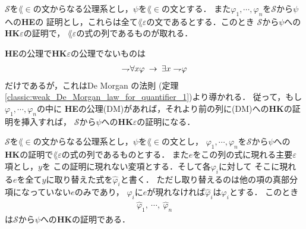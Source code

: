 	\begin{screen}
		\begin{metathm}
		\label{metathm:Henkin_expansion_1}
			$\mathscr{S}$を$\lang{\in}$の文からなる公理系とし，$\psi$を$\lang{\in}$の文とする．
			また$\varphi_{1},\cdots,\varphi_{n}$を$\mathscr{S}$から$\psi$への{\bf HE}の
			証明とし，これらは全て$\lang{\varepsilon}$の文であるとする．このとき
			$\mathscr{S}$から$\psi$への{\bf HK$\varepsilon$}の証明で，
			$\lang{\varepsilon}$の式の列であるものが取れる．
		\end{metathm}
	\end{screen}
	
	\begin{metaprf}
		{\bf HE}の公理で{\bf HK$\varepsilon$}の公理でないものは
		\begin{align}
			\rightharpoondown\hspace{-0.25em} \forall x \varphi \hspace{0.25em}\rightarrow\hspace{0.25em} \exists x \rightharpoondown\hspace{-0.25em} \varphi
		\end{align}
		だけであるが，これはDe Morgan の法則
		(定理\ref{classic:weak_De_Morgan_law_for_quantifier_1})より導かれる．
		従って，もし$\varphi_{1},\cdots,\varphi_{n}$の中に
		{\bf HE}の公理(DM)があれば，それより前の列に(DM)への{\bf HK}の証明を挿入すれば，
		$\mathscr{S}$から$\psi$への{\bf HK$\varepsilon$}の証明になる．
		\QED
	\end{metaprf}
	
	\begin{screen}
		\begin{metathm}
		\label{metathm:Henkin_expansion_2_lemma}
			$\mathscr{S}$を$\lang{\in}$の文からなる公理系とし，$\psi$を$\lang{\in}$の文とし，
			$\varphi_{1},\cdots,\varphi_{n}$を$\mathscr{S}$から$\psi$への
			{\bf HK}の証明で$\lang{\varepsilon}$の式の列であるものとする．
			また$e$をこの列の式に現れる主要$\varepsilon$項とし，$y$を
			この証明に現れない変項とする．そして各$\varphi_{i}$に対して
			そこに現れる$e$を全て$y$に取り替えた式を$\hat{\varphi}_{i}$と書く．
			ただし取り替えるのは他の項の真部分項になっていない$e$のみであり，
			$\varphi_{i}$に$e$が現れなければ$\hat{\varphi}_{i}$は$\varphi_{i}$とする．
			このとき
			\begin{align}
				\hat{\varphi}_{1},\ \cdots,\ \hat{\varphi}_{n}
			\end{align}
			は$\mathscr{S}$から$\psi$への{\bf HK}の証明である．
		\end{metathm}
	\end{screen}
	
